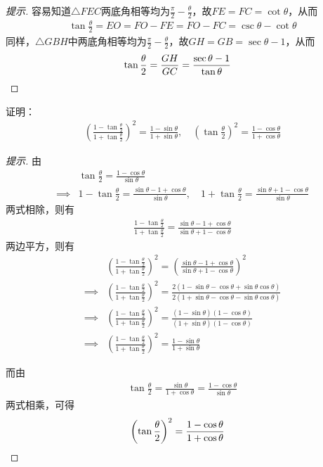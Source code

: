 \begin{proof}[提示]
  容易知道$\triangle FEC$两底角相等均为$\frac\pi2 - \frac\theta2$，故$FE=FC=\cot\theta$，从而
  \begin{align*}
    \tan\frac\theta2 = EO = FO - FE = FO - FC = \csc\theta - \cot\theta
  \end{align*}
  同样，$\triangle GBH$中两底角相等均为$\frac\pi2 - \frac\theta2$，故$GH=GB=\sec\theta - 1$，从而
  \begin{align*}
    \tan\frac\theta2 = \frac{GH}{GC} = \frac{\sec\theta - 1}{\tan\theta}&\qedhere
  \end{align*}
\end{proof}

\begin{example}证明：
  \begin{align*}
    \left( \frac{1 - \tan\frac\theta2}{1 + \tan\frac\theta2} \right)^2 =
    \frac{1 - \sin\theta}{1+\sin\theta}, \quad
    \left( \tan\frac\theta2 \right)^2 = \frac{1-\cos\theta}{1+\cos\theta}
  \end{align*}
\end{example}
\begin{proof}[提示]
由
  \begin{align*}
    &\tan\frac\theta2 = \frac{1-\cos\theta}{\sin\theta}\\
    \implies&
    1 - \tan\frac\theta2 = \frac{\sin\theta - 1+\cos\theta}{\sin\theta},\quad
    1 + \tan\frac\theta2 = \frac{\sin\theta + 1-\cos\theta}{\sin\theta}
  \end{align*}
  两式相除，则有
  \begin{align*}
    \frac{1 - \tan\frac\theta2}{1 + \tan\frac\theta2} = 
    \frac{\sin\theta - 1+\cos\theta}{\sin\theta + 1-\cos\theta}
  \end{align*}
  两边平方，则有
  \begin{align*}
    &\left( \frac{1 - \tan\frac\theta2}{1 + \tan\frac\theta2} \right)^2 =
     \left( \frac{\sin\theta - 1+\cos\theta}{\sin\theta + 1-\cos\theta} \right)^2\\
    \implies&\left( \frac{1 - \tan\frac\theta2}{1 + \tan\frac\theta2} \right)^2 =
             \frac{2(1 - \sin\theta - \cos\theta + \sin\theta\cos\theta)}{2(1+\sin\theta-\cos\theta-\sin\theta\cos\theta)}\\
    \implies&\left( \frac{1 - \tan\frac\theta2}{1 + \tan\frac\theta2} \right)^2 =
             \frac{(1 - \sin\theta)(1 - \cos\theta)}{(1+\sin\theta)(1-\cos\theta)}\\
    \implies&\left( \frac{1 - \tan\frac\theta2}{1 + \tan\frac\theta2} \right)^2 =
             \frac{1 - \sin\theta}{1+\sin\theta}
  \end{align*}

  而由
  \begin{align*}
    \tan\frac\theta2 = \frac{\sin\theta}{1+\cos\theta} = \frac{1-\cos\theta}{\sin\theta}
  \end{align*}
  两式相乘，可得
  \begin{align*}
    \left(\tan\frac\theta2\right)^2 = \frac{1-\cos\theta}{1+\cos\theta}&\qedhere
  \end{align*}
\end{proof}

